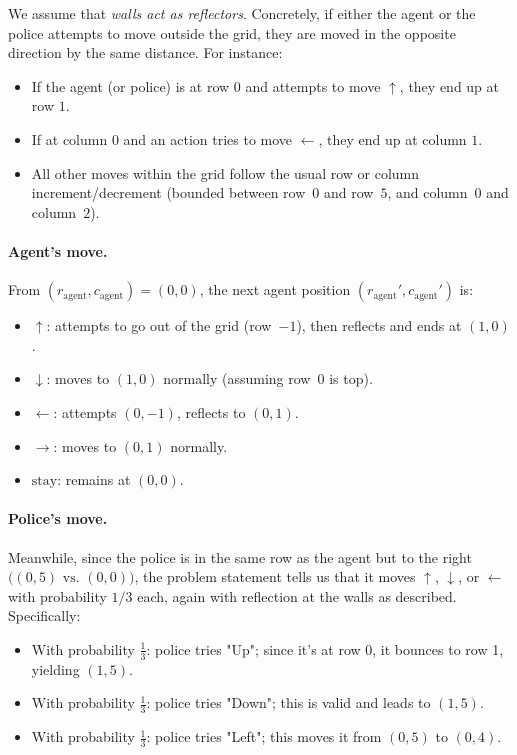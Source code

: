 \begin{enumerate}
    We assume that \emph{walls act as reflectors}.  Concretely, if either the agent or the police attempts to move outside the grid, they are moved in the opposite direction by the same distance.  For instance:
    \begin{itemize}
      \item If the agent (or police) is at row \(0\) and attempts to move \(\uparrow\), they end up at row \(1\).
      \item If at column \(0\) and an action tries to move \(\leftarrow\), they end up at column \(1\).
      \item All other moves within the grid follow the usual row or column increment/decrement (bounded between row~\(0\) and row~\(5\), and column~\(0\) and column~\(2\)).
    \end{itemize}

    \paragraph{Agent's move.}
    From \(
    (r_{\text{agent}},c_{\text{agent}}) = (0,0)\),
    the next agent position \((r_{\text{agent}}',c_{\text{agent}}')\) is:
    \begin{itemize}
      \item \(\uparrow\):  attempts to go out of the grid (row~\(-1\)), then reflects and ends at \((1,0)\).
      \item \(\downarrow\): moves to \((1,0)\) normally (assuming row~\(0\) is top).
      \item \(\leftarrow\): attempts \((0,-1)\), reflects to \((0,1)\).
      \item \(\rightarrow\): moves to \((0,1)\) normally.
      \item \(\text{stay}\): remains at \((0,0)\).
    \end{itemize}

    \paragraph{Police's move.}
    Meanwhile, since the police is in the same row as the agent but to the right
    \(\bigl( (0,5) \text{ vs. } (0,0) \bigr)\), the problem statement tells us that it moves
    \(\uparrow\), \(\downarrow\), or \(\leftarrow\) with probability \(1/3\) each, again with reflection at the walls as described. Specifically:
    \begin{itemize}
      \item With probability \(\frac{1}{3}\): police tries "Up"; since it's at row 0, it bounces to row 1, yielding \((1,5)\).
      \item With probability \(\frac{1}{3}\): police tries "Down"; this is valid and leads to \((1,5)\).
      \item With probability \(\frac{1}{3}\): police tries "Left"; this moves it from \((0,5)\) to \((0,4)\).
    \end{itemize}


\end{enumerate}
